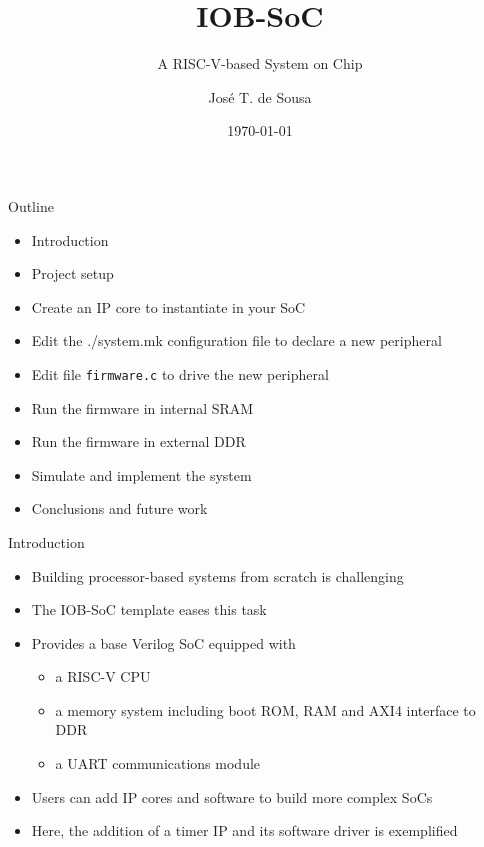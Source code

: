 \documentclass [xcolor=svgnames, t] {beamer}
\title[IOB-SoC Presentation]{IOB-SoC}
\subtitle{A RISC-V-based System on Chip}
\institute[IObundle Lda]{IObundle Lda.\\The Architecture for an Agile World}
\author[José T. de Sousa]{Jos\'e T. de Sousa}
\institute[IObundle Lda]{IObundle Lda}
\date{\today}
\begin{document}
\begin{frame}
 \titlepage   
\end{frame}


\begin{frame}{Outline}
\begin{center}
   \begin{itemize}
     \item Introduction
     \item Project setup
     \item Create an IP core to instantiate in your SoC
     \item Edit the ./system.mk configuration file to declare a new peripheral
     \item Edit file {\tt firmware.c} to drive the new peripheral
     \item Run the firmware in internal SRAM
     \item Run the firmware in external DDR
     \item Simulate and implement the system
     \item Conclusions and future work
 \end{itemize} 
\end{center}
\end{frame}


\begin{frame}{Introduction}
\begin{center}
    \begin{itemize}
      \item Building processor-based systems from scratch is challenging
      \item The IOB-SoC template eases this task
      \item Provides a base Verilog SoC equipped with
        \begin{itemize}
        \item a RISC-V CPU
        \item a memory system including boot ROM, RAM and AXI4 interface to DDR
        \item a UART communications module
        \end{itemize}
      \item Users can add IP cores and software to build more complex SoCs
      \item Here, the addition of a timer IP and its software driver is exemplified
    \end{itemize}
\end{center}
\end{frame}
\end{document}
